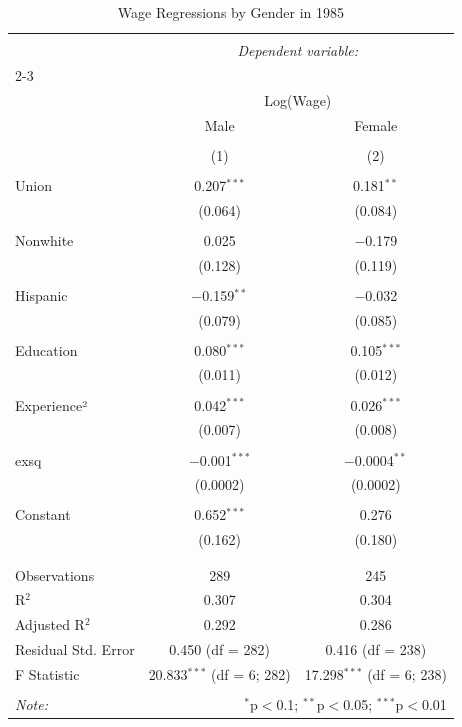 
\begin{table}[!htbp] \centering 
  \caption{Wage Regressions by Gender in 1985} 
  \label{} 
\begin{tabular}{@{\extracolsep{5pt}}lcc} 
\\[-1.8ex]\hline 
\hline \\[-1.8ex] 
 & \multicolumn{2}{c}{\textit{Dependent variable:}} \\ 
\cline{2-3} 
\\[-1.8ex] & \multicolumn{2}{c}{Log(Wage)} \\ 
 & Male & Female \\ 
\\[-1.8ex] & (1) & (2)\\ 
\hline \\[-1.8ex] 
 Union & 0.207$^{***}$ & 0.181$^{**}$ \\ 
  & (0.064) & (0.084) \\ 
  & & \\ 
 Nonwhite & 0.025 & $-$0.179 \\ 
  & (0.128) & (0.119) \\ 
  & & \\ 
 Hispanic & $-$0.159$^{**}$ & $-$0.032 \\ 
  & (0.079) & (0.085) \\ 
  & & \\ 
 Education & 0.080$^{***}$ & 0.105$^{***}$ \\ 
  & (0.011) & (0.012) \\ 
  & & \\ 
 Experience² & 0.042$^{***}$ & 0.026$^{***}$ \\ 
  & (0.007) & (0.008) \\ 
  & & \\ 
 exsq & $-$0.001$^{***}$ & $-$0.0004$^{**}$ \\ 
  & (0.0002) & (0.0002) \\ 
  & & \\ 
 Constant & 0.652$^{***}$ & 0.276 \\ 
  & (0.162) & (0.180) \\ 
  & & \\ 
\hline \\[-1.8ex] 
Observations & 289 & 245 \\ 
R$^{2}$ & 0.307 & 0.304 \\ 
Adjusted R$^{2}$ & 0.292 & 0.286 \\ 
Residual Std. Error & 0.450 (df = 282) & 0.416 (df = 238) \\ 
F Statistic & 20.833$^{***}$ (df = 6; 282) & 17.298$^{***}$ (df = 6; 238) \\ 
\hline 
\hline \\[-1.8ex] 
\textit{Note:}  & \multicolumn{2}{r}{$^{*}$p$<$0.1; $^{**}$p$<$0.05; $^{***}$p$<$0.01} \\ 
\end{tabular} 
\end{table} 
